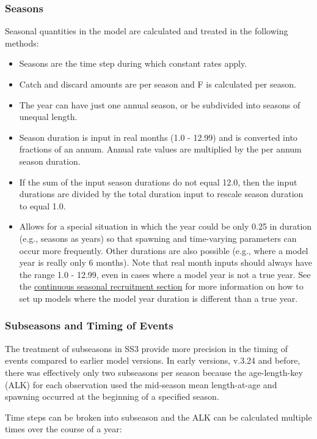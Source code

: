 \subsubsection{Seasons}
Seasonal quantities in the model are calculated and treated in the following methods:
	 \begin{itemize}
	 	\item Seasons are the time step during which constant rates apply.
	 	\item Catch and discard amounts are per season and F is calculated per season.
	 	\item The year can have just one annual season, or be subdivided into seasons of unequal length.
	 	\item Season duration is input in real months (1.0 - 12.99) and is converted into fractions of an annum.  Annual rate values are multiplied by the per annum season duration.
	 	\item If the sum of the input season durations do not equal 12.0, then the input durations are divided by the total duration input to rescale season duration to equal 1.0.  
	 	\item Allows for a special situation in which the year could be only 0.25 in duration (e.g., seasons as years) so that spawning and time-varying parameters can occur more frequently.	Other durations are also possible (e.g., where a model year is really only 6 months). Note that real month inputs should always have the range 1.0 - 12.99, even in cases where a model year is not a true year. See the \hyperlink{continuous-seasonal-recruitment-sec}{continuous seasonal recruitment section} for more information on how to set up models where the model year duration is different than a true year.
	 \end{itemize}

\subsubsection{Subseasons and Timing of Events}
\hypertarget{SubSeas}{}
The treatment of subseasons in SS3 provide more precision in the timing of events compared to earlier model versions. In early versions, v.3.24 and before, there was effectively only two subseasons per season because the age-length-key (ALK) for each observation used the mid-season mean length-at-age and spawning occurred at the beginning of a specified season.  

Time steps can be broken into subseason and the ALK can be calculated multiple times over the course of a year:

